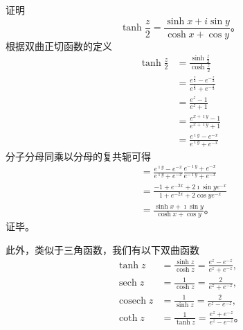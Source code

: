 \begin{examplebox}{证明
    \begin{equation*}\tanh \frac{z}{2}=\frac{\sinh x+i \sin y}{\cosh x+\cos y} \textrm{。}  
    \end{equation*}
}
根据双曲正切函数的定义
\begin{align*}
    \tanh \frac{z}{2} &= \frac{\sinh \frac{z}{2} }{ \cosh \frac{z}{2}}
    \\
    &= \frac{e^{\frac{z}{2}} - e^{-\frac{z}{2}}}{e^{\frac{z}{2}} + e^{-\frac{z}{2}}}
    \\
    &= \frac{e^{z} - 1}{e^{z} + 1} 
    \\
    &= \frac{e^{x+\imath y } -1 } { e^{x + \imath y } + 1}
    \\
    &=\frac{e^{\imath y } -e^{-x} } { e^{\imath y } + e^{-x}}
\end{align*}   
分子分母同乘以分母的复共轭可得
\begin{align*}
    &=\frac{e^{\imath y } -e^{-x} } { e^{\imath y } + e^{-x}} \frac{e^{-\imath y } + e^{-x}} { e^{-\imath y } + e^{-x}}
    \\
    &=\frac{-1+e^{-2x} + 2 \imath \sin y e^{-x}}{1+ e^{-2x} + 2 \cos y e^{-x} }
    \\
    &= \frac{\sinh x + \imath \sin y} {\cosh x + \cos y} \textrm{。}  
\end{align*}
证毕。
\end{examplebox}

此外，类似于三角函数，我们有以下双曲函数
\begin{equation}
    \begin{aligned}
    \tanh z & =\frac{\sinh z}{\cosh z}=\frac{e^z-e^{-z}}{e^z+e^{-z}}, \\
    \operatorname{sech} z & =\frac{1}{\cosh z}=\frac{2}{e^z+e^{-z}}, \\
    \operatorname{cosech} z & =\frac{1}{\sinh z}=\frac{2}{e^z-e^{-z}}, \\
    \operatorname{coth} z & =\frac{1}{\tanh z}=\frac{e^z+e^{-z}}{e^z-e^{-z}} \textrm{。} 
    \end{aligned}
\end{equation}



%     

